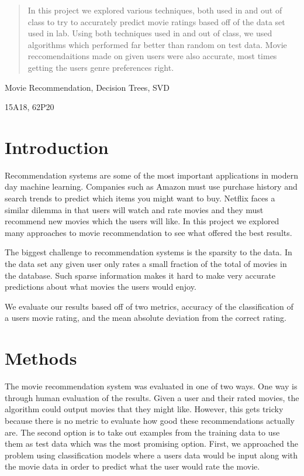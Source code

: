 \documentclass[review,onefignum,onetabnum]{siamart171218}
\begin{document}
\maketitle

\begin{abstract}
In this project we explored various techniques, both used in and out of class to try to accurately predict movie ratings based off of the data set used in lab. Using both techniques used in  and out of class, we used algorithms which performed far better than random on test data. Movie reccomendaitions made on given users were also accurate, most times getting the users genre preferences right.
\end{abstract}

\begin{keywords}
  Movie Recommendation, Decision Trees, SVD
\end{keywords}

\begin{AMS}
  15A18, 62P20
\end{AMS}

\section{Introduction}
Recommendation systems are some of the most important applications in modern day machine learning. Companies such as Amazon must use purchase history and search trends to predict which items you might want to buy. Netflix faces a similar dilemma in that users will watch and rate movies and they must recommend new movies which the users will like. In this project we explored many approaches to movie recommendation to see what offered the best results.

The biggest challenge to recommendation systems is the sparsity to the data. In the data set any given user only rates a small fraction of the total of movies in the database. Such sparse information makes it hard to make very accurate predictions about what movies the users would enjoy. 

	We evaluate our results based off of two metrics, accuracy of the classification of a users movie rating, and the mean absolute deviation from the correct rating.

\section{Methods}
\label{sec:methods}
The movie recommendation system was evaluated in one of two ways. One way is through human evaluation of the results. Given a user and their rated movies, the algorithm could output movies that they might like. However, this gets tricky because there is no metric to evaluate how good these recommendations actually are. The second option is to take out examples from the training data to use them as test data which was the most promising option. First, we approached the problem using classification models where a users data would be input along with the movie data in order to predict what the user would rate the movie. 
\end{document}

